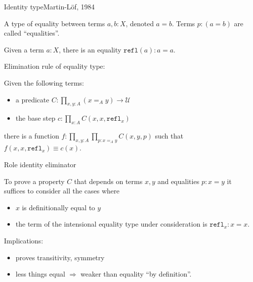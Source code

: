 \documentclass[english,handout]{beamer}
\begin{document}
\begin{frame}{Identity type}{Martin-L\"of, 1984}

    A type of equality between terms $a,b : X$, denoted $a = b$. Terms $p : (a =b)$ are called ``equalities''.

    \begin{definition}
        Given a term $a : X$, there is an equality $\texttt{refl}(a): a = a$.
    \end{definition}

       Elimination rule of equality type:

    \begin{definition}
            Given the following terms:
        \begin{itemize}
            \item a predicate \(C : \prod_{x,y:A} (x =_A y) \rightarrow \mathcal{U}\)
            \item the base step \(c:\prod_{x:A} C(x,x,\texttt{refl}_x)\)
        \end{itemize}
            there is a function \(f: \prod_{x,y:A} \prod_{p:x=_Ay}C(x,y,p)\) such that \(f(x,x,\texttt{refl}_x) \equiv c(x)\).
        
    \end{definition}

    
\end{frame}

\begin{frame}{Role identity eliminator}

    To prove a property \(C\) that depends on terms $x,y$ and equalities $p:x=y$  it suffices to consider all the cases where
        \begin{itemize}
            \item $x$ is definitionally equal to $y$
            \item the term of the intensional equality type under consideration is $\texttt{refl}_x : x = x$.
        \end{itemize}

        Implications:
        \begin{itemize}
            \item proves transitivity, symmetry
            \item less things equal $\Rightarrow$ weaker than equality ``by definition''.
        \end{itemize}
        
\end{frame}
\end{document}

